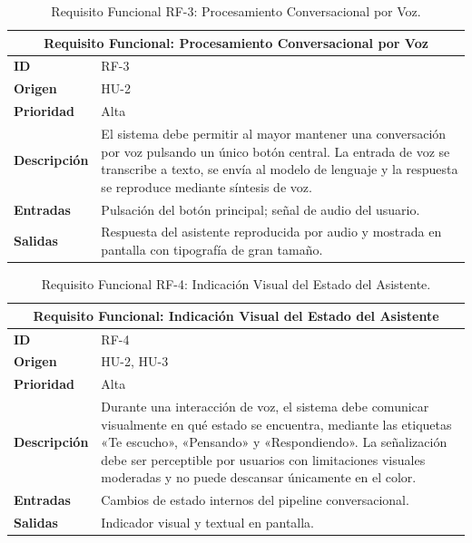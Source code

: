 \begin{table}[htbp]
    \centering
    \renewcommand{\arraystretch}{1.3}
    \begin{tabular}{|l|>{\raggedright\arraybackslash}p{}|}
        \hline
        \multicolumn{2}{|c|}{\textbf{Requisito Funcional: Procesamiento Conversacional por Voz}} \\
        \hline
        \textbf{ID} & RF-3 \\
        \hline
        \textbf{Origen} & HU-2 \\
        \hline
        \textbf{Prioridad} & Alta \\
        \hline
        \textbf{Descripción} & El sistema debe permitir al mayor mantener una
            conversación por voz pulsando un único botón central. La entrada de voz
            se transcribe a texto, se envía al modelo de lenguaje y la respuesta se
            reproduce mediante síntesis de voz. \\
        \hline
        \textbf{Entradas} & Pulsación del botón principal; señal de audio del usuario. \\
        \hline
        \textbf{Salidas} & Respuesta del asistente reproducida por audio y mostrada
            en pantalla con tipografía de gran tamaño. \\
        \hline
    \end{tabular}
    \caption{Requisito Funcional RF-3: Procesamiento Conversacional por Voz.}
    \label{tab:rf3}
\end{table}

\begin{table}[htbp]
    \centering
    \renewcommand{\arraystretch}{1.3}
    \begin{tabular}{|l|>{\raggedright\arraybackslash}p{}|}
        \hline
        \multicolumn{2}{|c|}{\textbf{Requisito Funcional: Indicación Visual del Estado del Asistente}} \\
        \hline
        \textbf{ID} & RF-4 \\
        \hline
        \textbf{Origen} & HU-2, HU-3 \\
        \hline
        \textbf{Prioridad} & Alta \\
        \hline
        \textbf{Descripción} & Durante una interacción de voz, el sistema debe comunicar visualmente en
            qué estado se encuentra, mediante las etiquetas «Te escucho», «Pensando» y «Respondiendo». La
            señalización debe ser perceptible por usuarios con limitaciones visuales moderadas y no puede
            descansar únicamente en el color. \\
        \hline
        \textbf{Entradas} & Cambios de estado internos del pipeline conversacional. \\
        \hline
        \textbf{Salidas} & Indicador visual y textual en pantalla. \\
        \hline
    \end{tabular}
    \caption{Requisito Funcional RF-4: Indicación Visual del Estado del Asistente.}
    \label{tab:rf4}
\end{table}

